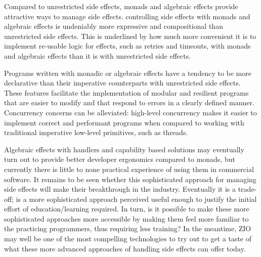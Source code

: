 Compared to unrestricted side effects, monads and algebraic effects provide attractive ways to manage side effects.  controlling side effects with monads and algebraic effects is undeniably more expressive and compositional than unrestricted side effects. This is underlined by how much more convenient it is to implement re-usable logic for effects, such as retries and timeouts, with monads and algebraic effects than it is with unrestricted side effects.

Programs written with monadic or algebraic effects have a tendency to be more declarative than their imperative counterparts with unrestricted side effects. These features facilitate the implementation of modular and resilient programs that are easier to modify and that respond to errors in a clearly defined manner. Concurrency concerns can be alleviated: high-level concurrency makes it easier to implement correct and performant programs when compared to working with traditional imperative low-level primitives, such as threads.


Algebraic effects with handlers and capability based solutions may eventually turn out to provide better developer ergonomics compared to monads, but currently there is little to none practical experience of using them in commercial software. It remains to be seen whether this sophisticated approach for managing side effects will make their breakthrough in the industry. Eventually it is a trade-off; is a more sophisticated approach perceived useful enough to justify the initial effort of education/learning required. In turn, is it possible to make these more sophisticated approaches more accessible by making them feel more familiar to the practicing programmers, thus requiring less training? In the meantime, ZIO may well be one of the most compelling technologies to try out to get a taste of what these more advanced approaches of handling side effects can offer today.
